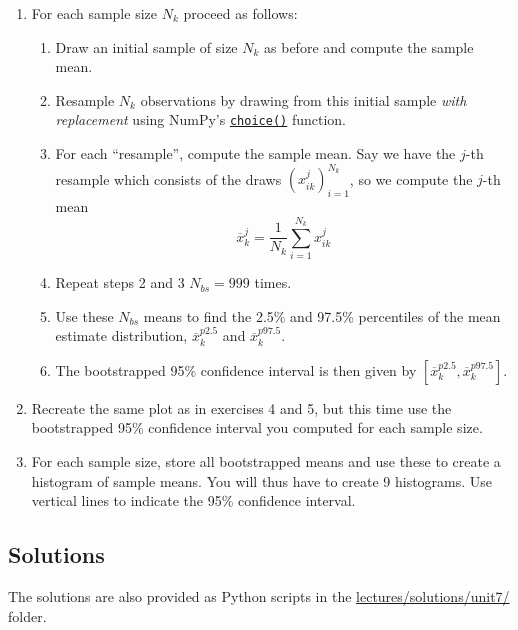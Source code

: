 \documentclass{scrartcl}
\providecommand{\tightlist}{%
      \setlength{\itemsep}{0pt}\setlength{\parskip}{0pt}}
\begin{document}
\begin{enumerate}
\def\labelenumi{\arabic{enumi}.}
\tightlist
\item
  For each sample size \(N_k\) proceed as follows:

  \begin{enumerate}
  \def\labelenumii{\arabic{enumii}.}
  \tightlist
  \item
    Draw an initial sample of size \(N_k\) as before and compute the
    sample mean.
  \item
    Resample \(N_k\) observations by drawing from this initial sample
    \emph{with}\\
    \emph{replacement} using NumPy's
    \href{https://numpy.org/doc/stable/reference/random/generated/numpy.random.Generator.choice.html}{\texttt{choice()}}
    function.
  \item
    For each ``resample'', compute the sample mean. Say we have the
    \(j\)-th resample which consists of the draws
    \((x_{ik}^j)_{i=1}^{N_k}\), so we compute the \(j\)-th mean \[
    \overline{x}_{k}^j = \frac{1}{N_k} \sum_{i=1}^{N_k} x_{ik}^j
    \]
  \item
    Repeat steps 2 and 3 \(N_{bs} = 999\) times.
  \item
    Use these \(N_{bs}\) means to find the 2.5\% and 97.5\% percentiles
    of the mean estimate distribution, \(\overline{x}_k^{p2.5}\) and
    \(\overline{x}_k^{p97.5}\).
  \item
    The bootstrapped 95\% confidence interval is then given by
    \(\left[\overline{x}_k^{p2.5}, \overline{x}_k^{p97.5}\right]\).
  \end{enumerate}
\item
  Recreate the same plot as in exercises 4 and 5, but this time use the
  bootstrapped 95\% confidence interval you computed for each sample
  size.
\item
  For each sample size, store all bootstrapped means and use these to
  create a histogram of sample means. You will thus have to create 9
  histograms. Use vertical lines to indicate the 95\% confidence
  interval.
\end{enumerate}


\hypertarget{solutions}{%
\subsection{Solutions}\label{solutions}}

The solutions are also provided as Python scripts in the
\href{../lectures/solutions/unit7}{lectures/solutions/unit7/} folder.
\end{document}
